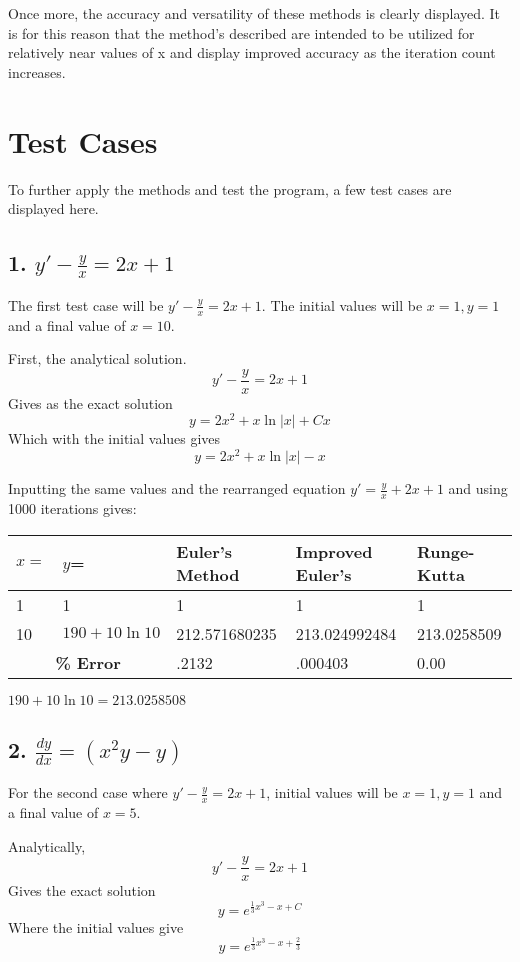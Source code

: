 \documentclass[12pt, letterpaper]{report}
\begin{document}
Once more, the accuracy and versatility of these methods is clearly displayed. It is for this reason that the method's described are intended to be utilized for relatively near values of x and display improved accuracy as the iteration count increases.
\newpage
\section*{Test Cases}
To further apply the methods and test the program, a few test cases are displayed here.

\subsection*{1. \(y'-\frac{y}{x}=2x+1\)}
The first test case will be \(y'-\frac{y}{x}=2x+1\). The initial values will be \(x=1, y=1\) and a final value of \(x=10\).

First, the analytical solution.\[y'-\frac{y}{x}=2x+1\] Gives as the exact solution \[y=2x^2+x\ln{|x|}+Cx\]Which with the initial values gives \[y=2x^2+x\ln{|x|}-x\]

Inputting the same values and the rearranged equation \(y'=\frac{y}{x}+2x+1\) and using 1000 iterations gives:

\begin{center}
\begin{tabular}{|l|l|l|l|l|}
    \hline
    \(x=\) & \(y\)= & Euler's Method & Improved Euler's & Runge-Kutta \\
    \hline
    1 & 1 & 1 & 1 & 1 \\
    \hline
    10 & \(190+10\ln{10}\) & 212.571680235 & 213.024992484 & 213.0258509 \\
    \hline
    \multicolumn{2}{|c|}{\textbf{\% Error}} & .2132 & .000403 & 0.00 \\
    \hline
\end{tabular}
\(190+10\ln{10}=213.0258508\)
\end{center}


\subsection*{2. \(\frac{dy}{dx}=(x^2y-y)\)}
For the second case where \(y'-\frac{y}{x}=2x+1\), initial values will be \(x=1, y=1\) and a final value of \(x=5\).

Analytically, \[y'-\frac{y}{x}=2x+1\] Gives the exact solution \[y=e^{\frac{1}{3}x^3-x+C}\]Where the initial values give \[y=e^{\frac{1}{3}x^3-x+\frac{2}{3}}\]
\end{document}
